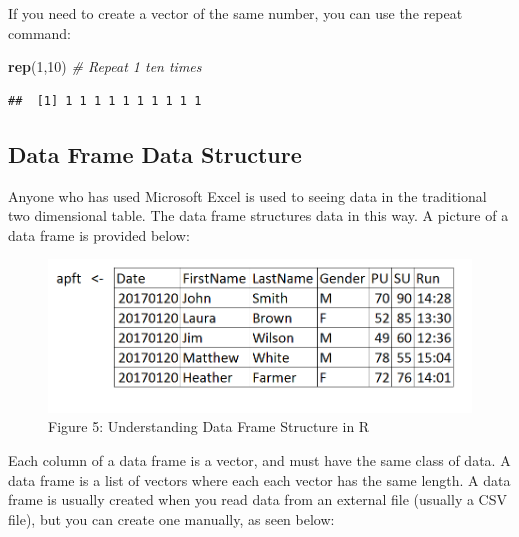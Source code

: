 \documentclass[]{book}
\newenvironment{Shaded}{\begin{snugshade}}{\end{snugshade}}
\newcommand{\KeywordTok}[1]{\textcolor[rgb]{0.13,0.29,0.53}{\textbf{{#1}}}}
\newcommand{\DecValTok}[1]{\textcolor[rgb]{0.00,0.00,0.81}{{#1}}}
\newcommand{\CommentTok}[1]{\textcolor[rgb]{0.56,0.35,0.01}{\textit{{#1}}}}
\newcommand{\NormalTok}[1]{{#1}}
\begin{document}
If you need to create a vector of the same number, you can use the
repeat command:

\begin{Shaded}
\begin{Highlighting}[]
\KeywordTok{rep}\NormalTok{(}\DecValTok{1}\NormalTok{,}\DecValTok{10}\NormalTok{)  }\CommentTok{# Repeat 1 ten times}
\end{Highlighting}
\end{Shaded}

\begin{verbatim}
##  [1] 1 1 1 1 1 1 1 1 1 1
\end{verbatim}

\subsection{Data Frame Data Structure}\label{data-frame-data-structure}

Anyone who has used Microsoft Excel is used to seeing data in the
traditional two dimensional table. The data frame structures data in
this way. A picture of a data frame is provided below:

\begin{figure}[htbp]
\centering
\includegraphics{dataframe.PNG}
\caption{Figure 5: Understanding Data Frame Structure in R}
\end{figure}

Each column of a data frame is a vector, and must have the same class of
data. A data frame is a list of vectors where each each vector has the
same length. A data frame is usually created when you read data from an
external file (usually a CSV file), but you can create one manually, as
seen below:
\end{document}
